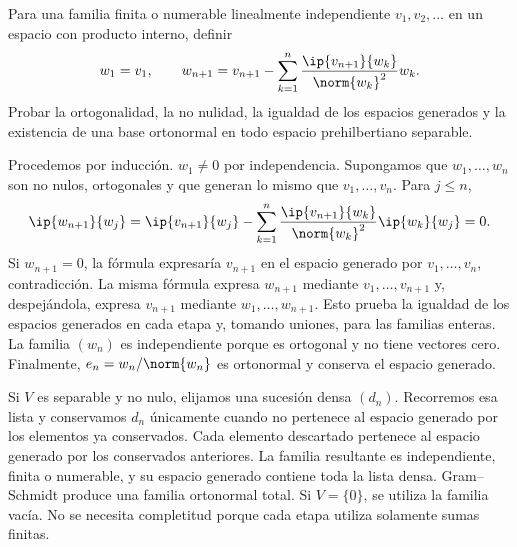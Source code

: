 \begin{ejercicio}\label{ej:lectura-31-1}
Para una familia finita o numerable linealmente independiente $v_1,v_2,\dots$ en un espacio con producto interno, definir
\[
 w_1=v_1,\qquad
 w_{n+1}=v_{n+1}-\sum_{k=1}^{n}\frac{\ip{v_{n+1}}{w_k}}{\norm{w_k}^{2}}w_k.
\]
Probar la ortogonalidad, la no nulidad, la igualdad de los espacios generados y la existencia de una base ortonormal en todo espacio prehilbertiano separable.
\end{ejercicio}
\begin{solucion}
Procedemos por inducción. $w_1\ne0$ por independencia. Supongamos que $w_1,\dots,w_n$ son no nulos, ortogonales y que generan lo mismo que $v_1,\dots,v_n$. Para $j\leq n$,
\[
 \ip{w_{n+1}}{w_j}
 =\ip{v_{n+1}}{w_j}
 -\sum_{k=1}^{n}\frac{\ip{v_{n+1}}{w_k}}{\norm{w_k}^{2}}\ip{w_k}{w_j}=0.
\]
Si $w_{n+1}=0$, la fórmula expresaría $v_{n+1}$ en el espacio generado por $v_1,\dots,v_n$, contradicción. La misma fórmula expresa $w_{n+1}$ mediante $v_1,\dots,v_{n+1}$ y, despejándola, expresa $v_{n+1}$ mediante $w_1,\dots,w_{n+1}$. Esto prueba la igualdad de los espacios generados en cada etapa y, tomando uniones, para las familias enteras. La familia $(w_n)$ es independiente porque es ortogonal y no tiene vectores cero. Finalmente, $e_n=w_n/\norm{w_n}$ es ortonormal y conserva el espacio generado.

Si $V$ es separable y no nulo, elijamos una sucesión densa $(d_n)$. Recorremos esa lista y conservamos $d_n$ únicamente cuando no pertenece al espacio generado por los elementos ya conservados. Cada elemento descartado pertenece al espacio generado por los conservados anteriores. La familia resultante es independiente, finita o numerable, y su espacio generado contiene toda la lista densa. Gram--Schmidt produce una familia ortonormal total. Si $V=\{0\}$, se utiliza la familia vacía. No se necesita completitud porque cada etapa utiliza solamente sumas finitas.
\end{solucion}

